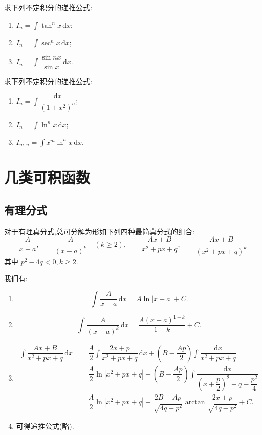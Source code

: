 \documentclass[../数学分析培优讲义.tex]{subfiles}
\begin{document}
\begin{example}
求下列不定积分的递推公式:
\begin{enumerate}[label=(\arabic*)]
    \item $\displaystyle I_n=\int\tan^n x\,\mathrm{d}x$;
    \item $\displaystyle I_n=\int\sec^n x\,\mathrm{d}x$;
    \item $\displaystyle I_n=\int\dfrac{\sin nx}{\sin x}\,\mathrm{d}x$.
\end{enumerate}
\end{example}
\exampleblank

\begin{example}
求下列不定积分的递推公式:
\begin{enumerate}[label=(\arabic*)]
    \item $\displaystyle I_n=\int\dfrac{\mathrm{d}x}{(1+x^2)^n}$;
    \item $\displaystyle I_n=\int\ln^n x\,\mathrm{d}x$;
    \item $\displaystyle I_{m,n}=\int x^m\ln^n x\,\mathrm{d}x$.
\end{enumerate}
\end{example}
\exampleblank


\newpage

\section{几类可积函数}


\subsection{有理分式}

对于有理真分式,总可分解为形如下列四种最简真分式的组合:
\[
    \dfrac{A}{x-a},\qquad
    \dfrac{A}{(x-a)^k}\quad(k\geq2),\qquad
    \dfrac{Ax+B}{x^2+px+q},\qquad
    \dfrac{Ax+B}{(x^2+px+q)^k}
\]
其中 $p^2-4q<0,k\geq2$.

我们有:
\begin{enumerate}[label=(\arabic*)]
    \item
    \[
        \int\dfrac{A}{x-a}\,\mathrm{d}x=A\ln|x-a|+C.
    \]
    \item
    \[
        \int\dfrac{A}{(x-a)^k}\,\mathrm{d}x
        =\dfrac{A(x-a)^{1-k}}{1-k}+C.
    \]
    \item
    \begin{align*}
        \int\dfrac{Ax+B}{x^2+px+q}\,\mathrm{d}x
        &=\dfrac{A}{2}\int\dfrac{2x+p}{x^2+px+q}\,\mathrm{d}x
        +\left(B-\dfrac{Ap}{2}\right)\int\dfrac{\mathrm{d}x}{x^2+px+q}\\
        &=\dfrac{A}{2}\ln|x^2+px+q|
        +\left(B-\dfrac{Ap}{2}\right)
        \int\dfrac{\mathrm{d}x}{\left(x+\dfrac{p}{2}\right)^2+q-\dfrac{p^2}{4}}\\
        &=\dfrac{A}{2}\ln|x^2+px+q|
        +\dfrac{2B-Ap}{\sqrt{4q-p^2}}
        \arctan\dfrac{2x+p}{\sqrt{4q-p^2}}+C.
    \end{align*}
    \item 可得递推公式(略).
\end{enumerate}
\end{document}
